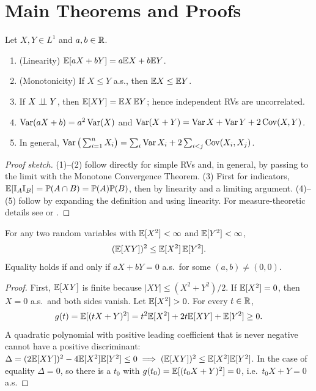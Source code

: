 \documentclass[main.tex]{subfiles}
\begin{document}
\section{Main Theorems and Proofs}

\begin{proposition}\label{prop:beklenen-ozellik}
Let $X,Y\in L^1$ and $a,b\in\mathbb{R}$.
\begin{enumerate}
  \item (Linearity) $\mathbb{E}[aX+bY]=a\mathbb{E} X+b\mathbb{E} Y$.
  \item (Monotonicity) If $X\le Y$ a.s., then $\mathbb{E} X\le\mathbb{E} Y$.
  \item If $X\perp\!\!\!\perp Y$, then $\mathbb{E}[XY]=\mathbb{E} X\,\mathbb{E} Y$; hence independent RVs are uncorrelated.
  \item $\operatorname{Var}(aX+b)=a^2\operatorname{Var}(X)$ and $\operatorname{Var}(X+Y)=\operatorname{Var} X+\operatorname{Var} Y+2\operatorname{Cov}(X,Y)$.
  \item In general, $\operatorname{Var}\big(\sum_{i=1}^n X_i\big)=\sum_i\operatorname{Var} X_i+2\sum_{i<j}\operatorname{Cov}(X_i,X_j)$.
\end{enumerate}
\end{proposition}
\begin{proof}[Proof sketch]
(1)--(2) follow directly for simple RVs and, in general, by passing to the limit with the Monotone Convergence Theorem. (3) First for indicators, $\mathbb{E}[\mathbb{I}_A\mathbb{I}_B]=\mathbb{P}(A\cap B)=\mathbb{P}(A)\mathbb{P}(B)$, then by linearity and a limiting argument. (4)--(5) follow by expanding the definition and using linearity. For measure-theoretic details see \cite[Sections~1.4--1.6]{durrett} or \cite[Sections~15--16 and 21]{billingsley}.
\end{proof}

\begin{theorem}\label{thm:cauchy-schwarz}
For any two random variables with $\mathbb{E}[X^2] < \infty$ and $\mathbb{E}[Y^2] < \infty$,
\[
(\mathbb{E}[XY])^2 \le \mathbb{E}[X^2]\,\mathbb{E}[Y^2].
\]
Equality holds if and only if $aX+bY=0$ a.s.\ for some $(a,b)\neq(0,0)$.
\end{theorem}
\begin{proof}
First, $\mathbb{E}[XY]$ is finite because $|XY|\le (X^2+Y^2)/2$. If $\mathbb{E}[X^2]=0$, then $X=0$ a.s.\ and both sides vanish. Let $\mathbb{E}[X^2]>0$. For every $t \in \mathbb{R}$,
\[
g(t) = \mathbb{E}[(tX + Y)^2] = t^2\mathbb{E}[X^2] + 2t\mathbb{E}[XY] + \mathbb{E}[Y^2] \ge 0 .
\]
A quadratic polynomial with positive leading coefficient that is never negative cannot have a positive discriminant:
$\Delta = (2\mathbb{E}[XY])^2 - 4\mathbb{E}[X^2]\mathbb{E}[Y^2] \le 0 \implies (\mathbb{E}[XY])^2 \le \mathbb{E}[X^2]\mathbb{E}[Y^2]$.
In the case of equality $\Delta=0$, so there is a $t_0$ with $g(t_0)=\mathbb{E}[(t_0X+Y)^2]=0$, i.e.\ $t_0X+Y=0$ a.s.
\end{proof}
\end{document}
